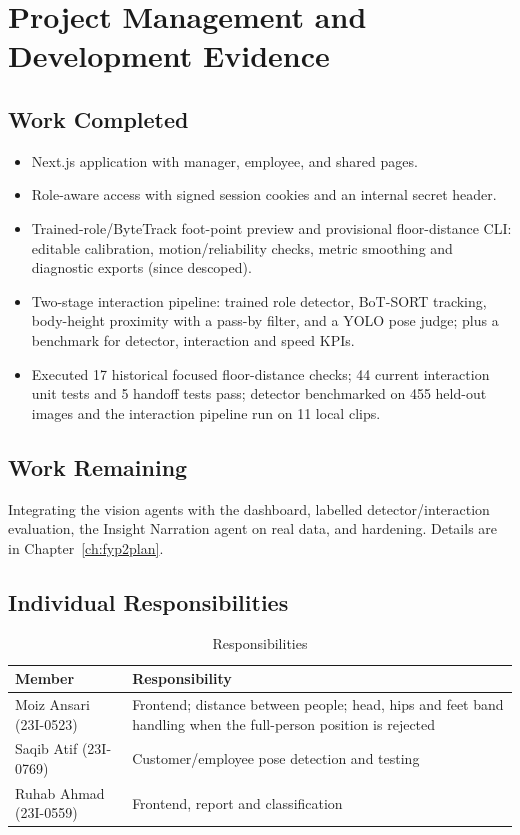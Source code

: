\chapter{Project Management and Development Evidence}
\label{ch:mgmt}
\section{Work Completed}
\begin{itemize}
\item Next.js application with manager, employee, and shared pages.
\item Role-aware access with signed session cookies and an internal secret header.
\item Trained-role/ByteTrack foot-point preview and provisional floor-distance CLI: editable calibration, motion/reliability checks, metric smoothing and diagnostic exports (since descoped).
\item Two-stage interaction pipeline: trained role detector, BoT-SORT tracking, body-height proximity with a pass-by filter, and a YOLO pose judge; plus a benchmark for detector, interaction and speed KPIs.
\item Executed 17 historical focused floor-distance checks; 44 current interaction unit tests and 5 handoff tests pass; detector benchmarked on 455 held-out images and the interaction pipeline run on 11 local clips.
\end{itemize}

\section{Work Remaining}
Integrating the vision agents with the dashboard, labelled detector/interaction evaluation, the Insight Narration agent on real data, and hardening. Details are in Chapter~\ref{ch:fyp2plan}.

\section{Individual Responsibilities}
\begin{table}[H]
\centering
\caption{Responsibilities}
\begin{tabular}{P{0.25\textwidth}P{0.62\textwidth}}
\toprule
Member & Responsibility\\
\midrule
Moiz Ansari (23I-0523) & Frontend; distance between people; head, hips and feet band handling when the full-person position is rejected\\
Saqib Atif (23I-0769) & Customer/employee pose detection and testing\\
Ruhab Ahmad (23I-0559) & Frontend, report and classification\\
\bottomrule
\end{tabular}
\end{table}

